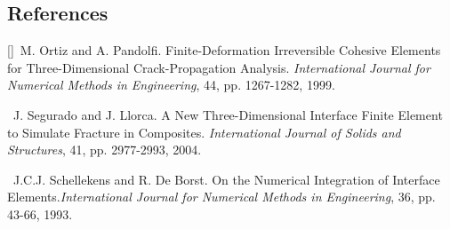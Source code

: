 \documentclass[11pt]{report}
\numberwithin{equation}{section}
\newcounter{sectrefs}
\begin{document}
 
\subsection {References}
\small
[\label {R:OP1999}\thesectrefs]~M. Ortiz 
and A. Pandolfi. Finite-Deformation Irreversible Cohesive Elements
for Three-Dimensional Crack-Propagation Analysis. 
\textit{International Journal for Numerical
Methods in Engineering}, 44, pp. 1267-1282, 1999.

\medskip
{}~J. Segurado and 
J. Llorca. A New Three-Dimensional Interface Finite Element to Simulate Fracture in Composites.
\textit{International Journal of Solids and Structures}, 41, pp. 2977-2993, 2004.

\medskip
{}~J.C.J. Schellekens and R. De Borst. On the Numerical Integration of Interface Elements.\textit{International Journal for Numerical
Methods in Engineering}, 36, pp. 43-66, 1993.
\end{document}
